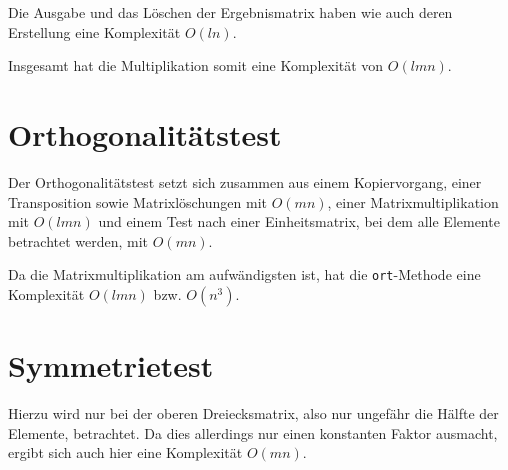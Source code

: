 \documentclass[a4paper,11pt]{scrartcl}
\begin{document}
Die Ausgabe und das Löschen der Ergebnismatrix haben wie auch deren 
Erstellung eine Komplexität $O(ln)$.

Insgesamt hat die Multiplikation somit eine Komplexität von $O(lmn)$.

\section{Orthogonalitätstest}
Der Orthogonalitätstest setzt sich zusammen aus einem Kopiervorgang, einer 
Transposition sowie Matrixlöschungen mit $O(mn)$, einer Matrixmultiplikation 
mit $O(lmn)$ und einem Test nach einer Einheitsmatrix, bei dem alle Elemente 
betrachtet werden, mit $O(mn)$.

Da die Matrixmultiplikation am aufwändigsten ist, hat die 
\texttt{ort}-Methode eine Komplexität $O(lmn)$ bzw. $O(n^3)$.

\section{Symmetrietest}
Hierzu wird nur bei der oberen Dreiecksmatrix, also nur ungefähr die Hälfte 
der Elemente, betrachtet. Da dies allerdings nur einen konstanten Faktor 
ausmacht, ergibt sich auch hier eine Komplexität $O(mn)$.
\end{document}
